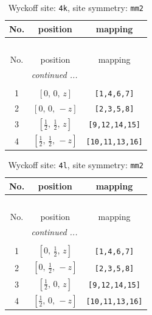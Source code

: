 \documentclass[fleqn,8pt]{jsarticle}
\begin{document}
\renewcommand{\arraystretch}{1.2}
\begin{longtable}{ccc}
\caption{Wyckoff site: {\tt 4k}, site symmetry: {\tt mm2}}
 \\
 \hline \hline
No. & position & mapping \\ \hline \endfirsthead

\multicolumn{2}{l}{\tablename\ \thetable{}} \\
 \hline \hline
No. & position & mapping \\ \hline \endhead

 \hline \hline
\multicolumn{2}{r}{\footnotesize\it continued ...} \\ \endfoot

 \hline \hline
\multicolumn{2}{r}{} \\ \endlastfoot

1 & $\left[ 0,\, 0,\, z \right]$ & {\tt [1,4,6,7]} \\ \hline
2 & $\left[ 0,\, 0,\, - z \right]$ & {\tt [2,3,5,8]} \\ \hline
3 & $\left[ \frac{1}{2},\, \frac{1}{2},\, z \right]$ & {\tt [9,12,14,15]} \\ \hline
4 & $\left[ \frac{1}{2},\, \frac{1}{2},\, - z \right]$ & {\tt [10,11,13,16]} \\
\end{longtable}
\renewcommand{\arraystretch}{1.2}
\begin{longtable}{ccc}
\caption{Wyckoff site: {\tt 4l}, site symmetry: {\tt mm2}}
 \\
 \hline \hline
No. & position & mapping \\ \hline \endfirsthead

\multicolumn{2}{l}{\tablename\ \thetable{}} \\
 \hline \hline
No. & position & mapping \\ \hline \endhead

 \hline \hline
\multicolumn{2}{r}{\footnotesize\it continued ...} \\ \endfoot

 \hline \hline
\multicolumn{2}{r}{} \\ \endlastfoot

1 & $\left[ 0,\, \frac{1}{2},\, z \right]$ & {\tt [1,4,6,7]} \\ \hline
2 & $\left[ 0,\, \frac{1}{2},\, - z \right]$ & {\tt [2,3,5,8]} \\ \hline
3 & $\left[ \frac{1}{2},\, 0,\, z \right]$ & {\tt [9,12,14,15]} \\ \hline
4 & $\left[ \frac{1}{2},\, 0,\, - z \right]$ & {\tt [10,11,13,16]} \\
\end{longtable}
\end{document}
